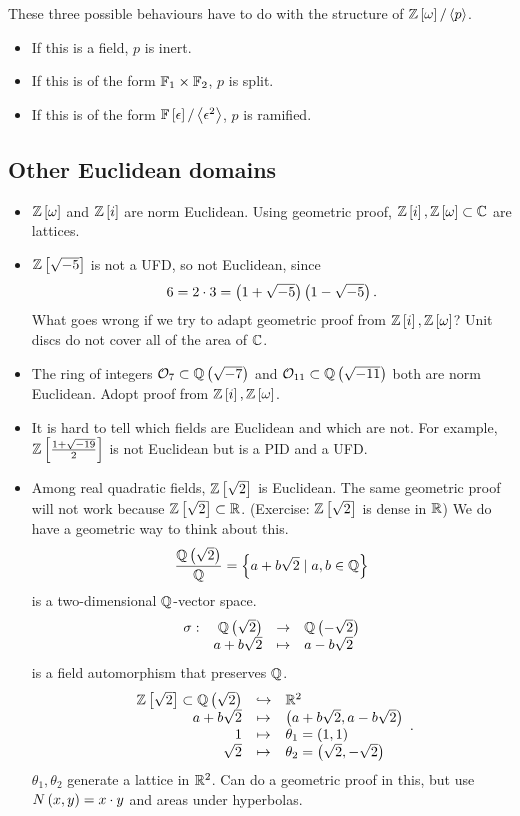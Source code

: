 \begin{remark*}
These three possible behaviours have to do with the structure of $ \mathbb{Z}\left[ \omega \right] / \left\langle p \right\rangle $.
\begin{itemize}
\item If this is a field, $ p $ is inert.
\item If this is of the form $ \mathbb{F}_1 \times \mathbb{F}_2 $, $ p $ is split.
\item If this is of the form $ \mathbb{F}\left[ \epsilon \right] / \left\langle \epsilon^2 \right\rangle $, $ p $ is ramified.
\end{itemize}
\end{remark*}

\pagebreak

\subsection{Other Euclidean domains}

\begin{itemize}
\item $ \mathbb{Z}\left[ \omega \right] $ and $ \mathbb{Z}\left[ i \right] $ are norm Euclidean. Using geometric proof, $ \mathbb{Z}\left[ i \right], \mathbb{Z}\left[ \omega \right] \subset \mathbb{C} $ are lattices.
\item $ \mathbb{Z}\left[ \sqrt{-5} \right] $ is not a UFD, so not Euclidean, since
$$ 6 = 2 \cdot 3 = \left( 1 + \sqrt{-5} \right)\left( 1 - \sqrt{-5} \right). $$
What goes wrong if we try to adapt geometric proof from $ \mathbb{Z}\left[ i \right], \mathbb{Z}\left[ \omega \right] $? Unit discs do not cover all of the area of $ \mathbb{C} $.
\item The ring of integers $ \mathcal{O}_7 \subset \mathbb{Q}\left( \sqrt{-7} \right) $ and $ \mathcal{O}_{11} \subset \mathbb{Q}\left( \sqrt{-11} \right) $ both are norm Euclidean. Adopt proof from $ \mathbb{Z}\left[ i \right], \mathbb{Z}\left[ \omega \right] $.
\item It is hard to tell which fields are Euclidean and which are not. For example, $ \mathbb{Z}\left[ \tfrac{1 + \sqrt{-19}}{2} \right] $ is not Euclidean but is a PID and a UFD.
\item Among real quadratic fields, $ \mathbb{Z}\left[ \sqrt{2} \right] $ is Euclidean. The same geometric proof will not work because $ \mathbb{Z}\left[ \sqrt{2} \right] \subset \mathbb{R} $. (Exercise: $ \mathbb{Z}\left[ \sqrt{2} \right] $ is dense in $ \mathbb{R} $) We do have a geometric way to think about this.
$$ \dfrac{\mathbb{Q}\left( \sqrt{2} \right)}{\mathbb{Q}} = \left\{ a + b\sqrt{2} \mid a, b \in \mathbb{Q} \right\} $$
is a two-dimensional $ \mathbb{Q} $-vector space.
$$ \function[\sigma]{\Q\rb{\sqrt{2}}}{\Q\rb{-\sqrt{2}}}{a + b\sqrt{2}}{a - b\sqrt{2}} $$
is a field automorphism that preserves $ \mathbb{Q} $.
$$
\begin{array}{rcl}
\mathbb{Z}\left[ \sqrt{2} \right] \subset \mathbb{Q}\left( \sqrt{2} \right) & \hookrightarrow & \mathbb{R}^2 \\
a + b\sqrt{2} & \mapsto & \left( a + b\sqrt{2}, a - b\sqrt{2} \right) \\
1 & \mapsto & \theta_1 = \left( 1, 1 \right) \\
\sqrt{2} & \mapsto & \theta_2 = \left( \sqrt{2}, -\sqrt{2} \right)
\end{array}.
$$
$ \theta_1, \theta_2 $ generate a lattice in $ \mathbb{R}^2 $. Can do a geometric proof in this, but use $ N\left( x, y \right) = x \cdot y $ and areas under hyperbolas.
\end{itemize}

